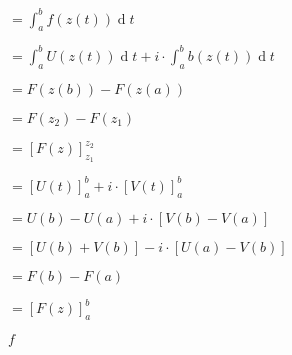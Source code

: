 \documentclass{report}
\def\lthtmlcheckvsize{\ifdim\ht\sizebox<\vsize 
  \ifdim\wd\sizebox<\hsize\expandafter\hfill\fi \expandafter\vfill
  \else\expandafter\vss\fi}%
\begin{document}
{\newpage\clearpage
{}%
$\displaystyle =  \int^{b}_{a} f\left( z\left( t \right)  \right)   \operatorname{d}t$%
\lthtmlindisplaymathZ
\lthtmlcheckvsize\clearpage}

{\newpage\clearpage
{}%
$\displaystyle = \int^{b}_{a} U\left( z\left( t \right)  \right)   \operatorname{d}t + i\cdot \int^{b}_{a} b\left( z\left( t \right)  \right)   \operatorname{d}t$%
\lthtmlindisplaymathZ
\lthtmlcheckvsize\clearpage}

{\newpage\clearpage
{}%
$\displaystyle = F\left( z\left( b \right)  \right) - F\left( z\left( a \right)  \right)$%
\lthtmlindisplaymathZ
\lthtmlcheckvsize\clearpage}

{\newpage\clearpage
{}%
$\displaystyle =  F\left( z_2 \right) - F\left( z_1 \right)$%
\lthtmlindisplaymathZ
\lthtmlcheckvsize\clearpage}

{\newpage\clearpage
{}%
$\displaystyle = \left[ F\left( z \right)  \right]^{z_2}_{z_1}$%
\lthtmlindisplaymathZ
\lthtmlcheckvsize\clearpage}

{\newpage\clearpage
{}%
$\displaystyle = \left[ U\left( t \right)  \right]^{b}_{a} +  i \cdot  \left[ V\left( t \right)  \right]^{b}_{a}$%
\lthtmlindisplaymathZ
\lthtmlcheckvsize\clearpage}

{\newpage\clearpage
{}%
$\displaystyle = U\left( b \right) - U\left( a \right) +  i \cdot  \left[ V\left( b \right) - V\left( a \right)  \right]$%
\lthtmlindisplaymathZ
\lthtmlcheckvsize\clearpage}

{\newpage\clearpage
{}%
$\displaystyle = \left[ U\left( b \right)+  V\left( b   \right)  \right] -  i \cdot  \left[ U\left( a \right) - V\left( b \right)  \right]$%
\lthtmlindisplaymathZ
\lthtmlcheckvsize\clearpage}

{\newpage\clearpage
{}%
$\displaystyle = F\left( b \right) - F\left( a \right)$%
\lthtmlindisplaymathZ
\lthtmlcheckvsize\clearpage}

{\newpage\clearpage
{}%
$\displaystyle = \left[ F\left( z \right)  \right]^{b}_{a}$%
\lthtmlindisplaymathZ
\lthtmlcheckvsize\clearpage}

{\newpage\clearpage
{}%
$ f$%
\lthtmlindisplaymathZ
\lthtmlcheckvsize\clearpage}
\end{document}
